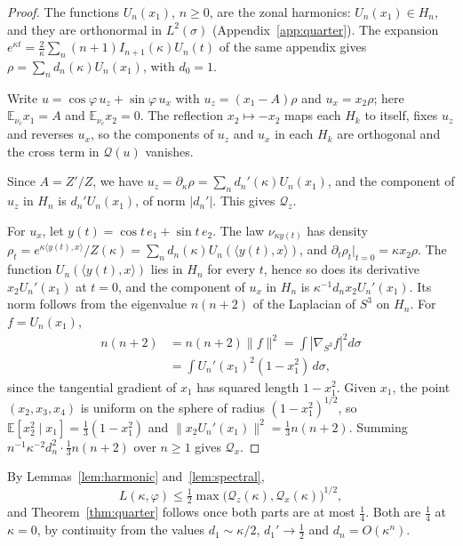 \documentclass[aps,prd,twocolumn,superscriptaddress,nofootinbib,longbibliography,floatfix,amsmath,amssymb,10pt]{revtex4-2}
\theoremstyle{definition}
\theoremstyle{remark}
\newcommand{\E}{\mathbb{E}}
\newcommand{\ip}[2]{\langle #1,#2\rangle}
\begin{document}
\begin{proof}
The functions $U_n(x_1)$, $n\ge0$, are the zonal harmonics: $U_n(x_1)\in
H_n$, and they are orthonormal in $L^2(\sigma)$ (Appendix~\ref{app:quarter}).
The expansion $e^{\kappa t}=\frac2\kappa\sum_n(n+1)I_{n+1}(\kappa)U_n(t)$ of
the same appendix gives $\rho=\sum_nd_n(\kappa)U_n(x_1)$, with $d_0=1$.

Write $u=\cos\varphi\,u_z+\sin\varphi\,u_x$ with $u_z=(x_1-A)\rho$ and
$u_x=x_2\rho$; here $\E_{\nu_c}x_1=A$ and $\E_{\nu_c}x_2=0$. The reflection
$x_2\mapsto-x_2$ maps each $H_k$ to itself, fixes $u_z$ and reverses $u_x$,
so the components of $u_z$ and $u_x$ in each $H_k$ are orthogonal and the
cross term in $\mathcal Q(u)$ vanishes.

Since $A=Z'/Z$, we have $u_z=\partial_\kappa\rho=\sum_nd_n'(\kappa)U_n(x_1)$,
and the component of $u_z$ in $H_n$ is $d_n'U_n(x_1)$, of norm $|d_n'|$. This
gives $\mathcal Q_z$.

For $u_x$, let $y(t)=\cos t\,e_1+\sin t\,e_2$. The law $\nu_{\kappa y(t)}$ has
density $\rho_t=e^{\kappa\ip{y(t)}x}/Z(\kappa)=\sum_nd_n(\kappa)U_n(\ip{y(t)}x)$,
and $\partial_t\rho_t|_{t=0}=\kappa x_2\rho$. The function
$U_n(\ip{y(t)}x)$ lies in $H_n$ for every $t$, hence so does its derivative
$x_2U_n'(x_1)$ at $t=0$, and the component of $u_x$ in $H_n$ is
$\kappa^{-1}d_nx_2U_n'(x_1)$. Its norm follows from the eigenvalue
$n(n+2)$ of the Laplacian of $S^3$ on $H_n$. For $f=U_n(x_1)$,
\[
\begin{aligned}
n(n+2)&=n(n+2)\|f\|^2=\int|\nabla_{S^3}f|^2d\sigma\\
&=\int U_n'(x_1)^2(1-x_1^2)\,d\sigma ,
\end{aligned}
\]
since the tangential gradient of $x_1$ has squared length $1-x_1^2$. Given
$x_1$, the point $(x_2,x_3,x_4)$ is uniform on the sphere of radius
$(1-x_1^2)^{1/2}$, so $\E[x_2^2\mid x_1]=\frac13(1-x_1^2)$ and
$\|x_2U_n'(x_1)\|^2=\frac13n(n+2)$. Summing $n^{-1}\kappa^{-2}d_n^2\cdot\frac13
n(n+2)$ over $n\ge1$ gives $\mathcal Q_x$.
\end{proof}

By Lemmas~\ref{lem:harmonic} and~\ref{lem:spectral},
\begin{equation}\label{eq:Lbyq}
L(\kappa,\varphi)\le\tfrac12\max\bigl(\mathcal Q_z(\kappa),\mathcal Q_x(
\kappa)\bigr)^{1/2},
\end{equation}
and Theorem~\ref{thm:quarter} follows once both parts are at most
$\frac14$. Both are $\frac14$ at $\kappa=0$, by continuity from the values
$d_1\sim\kappa/2$, $d_1'\to\frac12$ and $d_n=O(\kappa^n)$.
\end{document}
